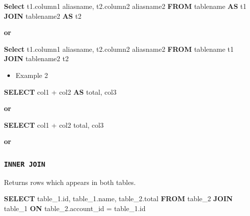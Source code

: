 \documentclass[]{book}
\newenvironment{Shaded}{\begin{snugshade}}{\end{snugshade}}
\newcommand{\KeywordTok}[1]{\textcolor[rgb]{0.13,0.29,0.53}{\textbf{#1}}}
\newcommand{\DecValTok}[1]{\textcolor[rgb]{0.00,0.00,0.81}{#1}}
\newcommand{\NormalTok}[1]{#1}
\providecommand{\tightlist}{%
  \setlength{\itemsep}{0pt}\setlength{\parskip}{0pt}}
\begin{document}
\begin{Shaded}
\begin{Highlighting}[]
\KeywordTok{Select}\NormalTok{ t1.column1 aliasname, t2.column2 aliasname2}
\KeywordTok{FROM}\NormalTok{ tablename }\KeywordTok{AS}\NormalTok{ t1}
\KeywordTok{JOIN}\NormalTok{ tablename2 }\KeywordTok{AS}\NormalTok{ t2}
\end{Highlighting}
\end{Shaded}

\textbf{or}

\begin{Shaded}
\begin{Highlighting}[]
\KeywordTok{Select}\NormalTok{ t1.column1 aliasname, t2.column2 aliasname2}
\KeywordTok{FROM}\NormalTok{ tablename t1}
\KeywordTok{JOIN}\NormalTok{ tablename2 t2}
\end{Highlighting}
\end{Shaded}

\begin{itemize}
\tightlist
\item
  Example 2
\end{itemize}

\begin{Shaded}
\begin{Highlighting}[]
\KeywordTok{SELECT}\NormalTok{ col1 + col2 }\KeywordTok{AS}\NormalTok{ total, col3}
\end{Highlighting}
\end{Shaded}

\textbf{or}

\begin{Shaded}
\begin{Highlighting}[]
\KeywordTok{SELECT}\NormalTok{ col1 + col2 total, col3}
\end{Highlighting}
\end{Shaded}

\textbf{or}

\subsubsection{\texorpdfstring{\texttt{INNER\ JOIN}}{INNER JOIN}}\label{inner-join}

Returns rows which appears in both tables.

\begin{Shaded}
\begin{Highlighting}[]
\KeywordTok{SELECT}\NormalTok{ table_1.id, table_1.name, table_2.total}
  \KeywordTok{FROM}\NormalTok{ table_}\DecValTok{2}
    \KeywordTok{JOIN}\NormalTok{ table_}\DecValTok{1}
      \KeywordTok{ON}\NormalTok{ table_2.account_id = table_1.id}
\end{Highlighting}
\end{Shaded}
\end{document}
